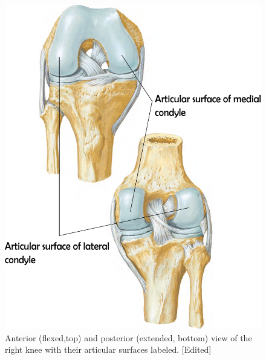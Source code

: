 \documentclass{micro-econ-thesis}
\begin{document}
\begin{figure}[H]
	\centering
	\includegraphics[scale=0.3]{right_knee_labeled}
	\caption{Anterior (flexed,top) and posterior (extended, bottom) view of the right knee with their articular surfaces labeled. [Edited] \parencite[p.519]{netter_519_2023}}
	\label{fig:rightkneeplate519}
\end{figure}
\end{document}
